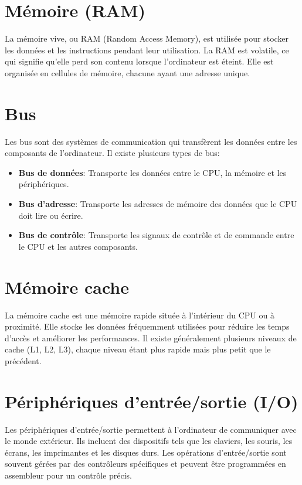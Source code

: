 \documentclass[a4paper, 12pt]{report}
\begin{document}
\section{Mémoire (RAM)}
La mémoire vive, ou RAM (Random Access Memory), est utilisée pour stocker les données et les instructions pendant leur utilisation. La RAM est volatile, ce qui signifie qu'elle perd son contenu lorsque l'ordinateur est éteint. Elle est organisée en cellules de mémoire, chacune ayant une adresse unique.

\section{Bus}
Les bus sont des systèmes de communication qui transfèrent les données entre les composants de l'ordinateur. Il existe plusieurs types de bus:
\begin{itemize}
  \item \textbf{Bus de données}: Transporte les données entre le CPU, la mémoire et les périphériques.
  \item \textbf{Bus d'adresse}: Transporte les adresses de mémoire des données que le CPU doit lire ou écrire.
  \item \textbf{Bus de contrôle}: Transporte les signaux de contrôle et de commande entre le CPU et les autres composants.
\end{itemize}

\section{Mémoire cache}
La mémoire cache est une mémoire rapide située à l'intérieur du CPU ou à proximité. Elle stocke les données fréquemment utilisées pour réduire les temps d'accès et améliorer les performances. Il existe généralement plusieurs niveaux de cache (L1, L2, L3), chaque niveau étant plus rapide mais plus petit que le précédent.

\section{Périphériques d'entrée/sortie (I/O)}
Les périphériques d'entrée/sortie permettent à l'ordinateur de communiquer avec le monde extérieur. Ils incluent des dispositifs tels que les claviers, les souris, les écrans, les imprimantes et les disques durs. Les opérations d'entrée/sortie sont souvent gérées par des contrôleurs spécifiques et peuvent être programmées en assembleur pour un contrôle précis.
\end{document}
